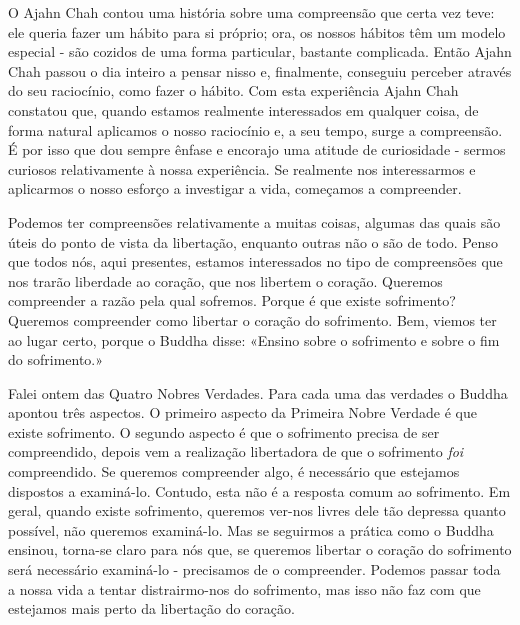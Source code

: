 O Ajahn Chah contou uma história sobre uma compreensão que certa vez
teve: ele queria fazer um hábito para si próprio; ora, os nossos hábitos
têm um modelo especial - são cozidos de uma forma particular, bastante
complicada. Então Ajahn Chah passou o dia inteiro a pensar nisso e,
finalmente, conseguiu perceber através do seu raciocínio, como fazer o
hábito. Com esta experiência Ajahn Chah constatou que, quando estamos
realmente interessados em qualquer coisa, de forma natural aplicamos o
nosso raciocínio e, a seu tempo, surge a compreensão. É por isso que dou
sempre ênfase e encorajo uma atitude de curiosidade - sermos curiosos
relativamente à nossa experiência. Se realmente nos interessarmos e
aplicarmos o nosso esforço a investigar a vida, começamos a compreender.

Podemos ter compreensões relativamente a muitas coisas, algumas das
quais são úteis do ponto de vista da libertação, enquanto outras não o
são de todo. Penso que todos nós, aqui presentes, estamos interessados
no tipo de compreensões que nos trarão liberdade ao coração, que nos
libertem o coração. Queremos compreender a razão pela qual sofremos.
Porque é que existe sofrimento? Queremos compreender como libertar o
coração do sofrimento. Bem, viemos ter ao lugar certo, porque o Buddha
disse: «Ensino sobre o sofrimento e sobre o fim do sofrimento.»

Falei ontem das Quatro Nobres Verdades. Para cada uma das verdades o
Buddha apontou três aspectos. O primeiro aspecto da Primeira Nobre
Verdade é que existe sofrimento. O segundo aspecto é que o sofrimento
precisa de ser compreendido, depois vem a realização libertadora de que
o sofrimento \emph{foi} compreendido. Se queremos compreender algo, é
necessário que estejamos dispostos a examiná-lo. Contudo, esta não é a
resposta comum ao sofrimento. Em geral, quando existe sofrimento,
queremos ver-nos livres dele tão depressa quanto possível, não queremos
examiná-lo. Mas se seguirmos a prática como o Buddha ensinou, torna-se
claro para nós que, se queremos libertar o coração do sofrimento será
necessário examiná-lo - precisamos de o compreender. Podemos passar toda
a nossa vida a tentar distrairmo-nos do sofrimento, mas isso não faz com
que estejamos mais perto da libertação do coração.

